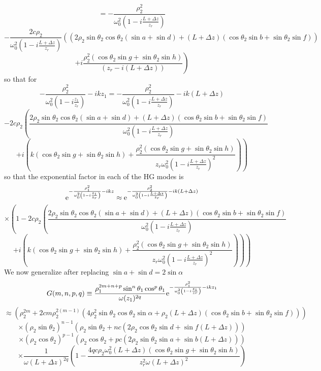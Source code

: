 \documentclass[11pt]{amsart}
\makeatletter
\newcommand{\e}{{\rm e}}				%
\newcommand{\0}{\varnothing}		%
\newcommand{\apr}{\approx}		%
\newcommand{\eq}{\equiv}		%
\newcommand{\1}{!}
\newcommand{\2}{@}
\newcommand{\3}{\#}
\newcommand{\4}{\$}
\newcommand{\5}{\%}
\newcommand{\6}{$^\wedge$}
\newcommand{\7}{\&}
\newcommand{\8}{*}
\newcommand{\9}{(}
\makeatother
\begin{document}
\[
=-\frac{\rho_2^2}{\omega_0^2\left(1-i\frac{L+\Delta z}{z_r}\right)}
\]
\[
-\frac{2c\rho_2}{\omega_0^2\left(1-i\frac{L+\Delta z}{z_r}\right)}\left(\left(2\rho_2\sin\theta_2\cos\theta_2\left(\sin a+\sin d\right)+\left(L+\Delta z\right)\left(\cos\theta_2\sin b +\sin \theta_2\sin f\right)\right)\right.
\]
\[
\left.+i\frac{\rho_2^2\left(\cos\theta_2 \sin g +\sin \theta_2\sin h\right)}{\left(z_r-i\left(L+\Delta z\right)\right)}\right)
\]
so that for 
\[
-\frac{\rho_2^2}{\omega_0^2\left(1-i\frac{z_1}{z_r}\right)}-ikz_1 = -\frac{\rho_2^2}{\omega_0^2\left(1-i\frac{L+\Delta z}{z_r}\right)}-ik\left(L+\Delta z\right)\]
\[
-2c\rho_2\left(\frac{2\rho_2\sin\theta_2\cos\theta_2\left(\sin a + \sin d\right)+\left(L+\Delta z\right)\left(\cos\theta_2\sin b +\sin \theta_2\sin f\right)}{\omega_0^2\left(1-i\frac{L+\Delta z}{z_r}\right)}\right.
\]
\[
\left.+i\left(k\left(\cos\theta_2 \sin g + \sin \theta_2\sin h\right)+\frac{\rho_2^2\left(\cos \theta_2\sin g +\sin \theta_2\sin h\right)}{z_r\omega_0^2\left(1-i\frac{L+\Delta z}{z_r}\right)^2}\right)\right)
\]
so that the exponential factor in each of the HG modes is
\[
\e^{-\frac{\rho_1^2}{\omega_0^2\left(1-i\frac{z_1}{z_r}\right)}-ikz}\apr \e^{-\frac{\rho_2^2}{\omega_0^2\left(1-i\frac{L+\Delta z}{z_r}\right)}-ik\left(L+\Delta z\right)}
\]
\[
\times\left(1-2c\rho_2\left(\frac{2\rho_2\sin\theta_2\cos\theta_2\left(\sin a+\sin d\right)+\left(L+\Delta z\right)\left(\cos \theta_2\sin b  + \sin \theta_2\sin f\right)}{\omega_0^2\left(1-i\frac{L+\Delta z}{z_r}\right)}\right.\right.
\]
\[
\left.\left.+i\left(k\left(\cos \theta_2 \sin g + \sin \theta_2 \sin h\right)+\frac{\rho_2^2\left(\cos\theta_2\sin g+\sin \theta_2\sin h\right)}{z_r\omega_0^2\left(1-i\frac{L+\Delta z}{z_r}\right)^2}\right)\right)\right)
\]
We now generalize after replacing $\sin a + \sin d = 2\sin \alpha$
\[
G(m,n,p,q)\eq \frac{\rho_1^{2m+n+p}\sin^n\theta_1\cos^p\theta_1}{\omega(z_1)^{2q}}\e^{-\frac{\rho_1^2}{\omega_0^2\left(1-i\frac{z_1}{zr}\right)}-ikz_1}
\]
\[
\apr \left(\rho_2^{2m}+2cm\rho_2^{2(m-1)}\left(4\rho_2^2\sin \theta_2\cos\theta_2\sin \alpha+\rho_2\left(L+\Delta z\right)\left(\cos \theta_2\sin b + \sin \theta_2 \sin f\right)\right)\right)
\]
\[
\times\left(\rho_2\sin\theta_2\right)^{n-1}\left(\rho_2\sin \theta_2 +nc\left(2\rho_2\cos\theta_2\sin d + \sin f\left(L+\Delta z\right)\right)\right)
\]
\[
\times \left(\rho_2\cos\theta_2\right)^{p-1}
\left(
\rho_2\cos \theta_2+pc\left(2\rho_2\sin\theta_2\sin a+\sin b\left(L+\Delta z\right)\right)
\right)
\]
\[
\times\frac{1}{\omega\left(L+\Delta z\right)^{2q}} \left(1-\frac{4qc\rho_2\omega_0^2\left(L+\Delta z\right)\left(\cos\theta_2\sin g+\sin\theta_2 \sin h\right)}{z_r^2\omega\left(L+\Delta z\right)^2}\right)
\]
\end{document}
